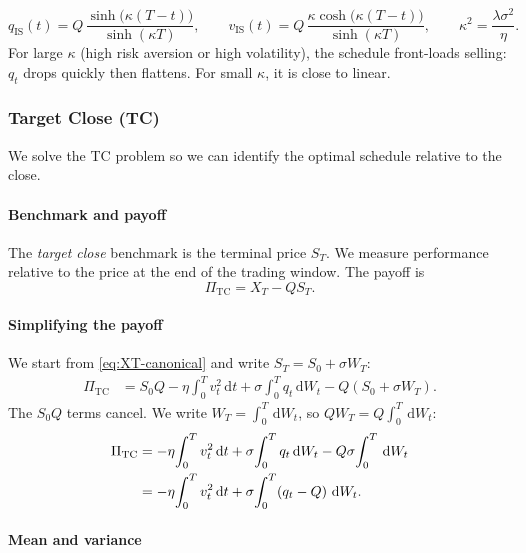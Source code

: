 \documentclass[12pt, a4paper]{article}
\newcommand{\dd}{\,\mathrm{d}}
\newcommand{\kap}{\kappa}
\begin{document}
\begin{resultbox}
\[
  q_{\mathrm{IS}}(t) = Q\,\frac{\sinh\!\bigl(\kap(T-t)\bigr)}{\sinh(\kap T)},
  \qquad
  v_{\mathrm{IS}}(t) = Q\,\frac{\kap\cosh\!\bigl(\kap(T-t)\bigr)}{\sinh(\kap T)},
  \qquad \kap^2 = \frac{\lambda\sigma^2}{\eta}.
\]
For large $\kap$ (high risk aversion or high volatility), the schedule front-loads
selling: $q_t$ drops quickly then flattens. For small $\kap$, it is close to linear.
\end{resultbox}

\subsubsection{Target Close (TC)}
\label{sec:TC}

We solve the TC problem so we can identify the optimal schedule relative to the close.

\paragraph{Benchmark and payoff}

The \emph{target close} benchmark is the terminal price $S_T$.
We measure performance relative to the price at the end of the trading window.
The payoff is
\[
  \Pi_{\mathrm{TC}} = X_T - QS_T.
\]

\paragraph{Simplifying the payoff}

We start from \eqref{eq:XT-canonical} and write $S_T = S_0 + \sigma W_T$:
\begin{align*}
  \Pi_{\mathrm{TC}}
  &= S_0 Q - \eta\!\int_0^T v_t^2 \dd t + \sigma\!\int_0^T q_t \dd W_t
     - Q(S_0 + \sigma W_T).
\end{align*}
The $S_0 Q$ terms cancel.
We write $W_T = \int_0^T \dd W_t$, so $QW_T = Q\int_0^T \dd W_t$:
\begin{align}
  \Pi_{\mathrm{TC}}
  &= - \eta\!\int_0^T v_t^2 \dd t + \sigma\!\int_0^T q_t \dd W_t
     - Q\sigma\!\int_0^T \dd W_t \notag\\
  &= - \eta\!\int_0^T v_t^2 \dd t + \sigma\!\int_0^T (q_t - Q)\,\dd W_t.
  \label{eq:PiTC}
\end{align}

\paragraph{Mean and variance}
\end{document}
